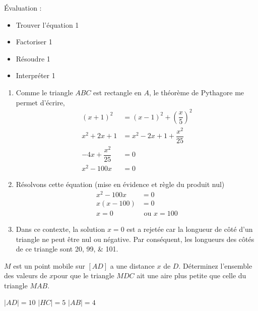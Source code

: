 \documentclass[../partie1.tex]{subfiles}
\begin{document}
\begin{solution}
    Évaluation :
    \begin{itemize}
        \item Trouver l'équation \hfill 1
        \item Factoriser \hfill 1
        \item Résoudre \hfill 1
        \item Interpréter \hfill 1
    \end{itemize}
    \begin{enumerate}
        \item Comme le triangle $ABC$ est rectangle en $A$, le théorème de Pythagore me permet d'écrire,
              \begin{align*}
                  (x+1)^2               & = (x-1)^2 +  \left(\dfrac{x}{5}\right)^2 \\
                  x^2+2x+1              & = x^2 - 2x + 1 + \dfrac{x^2}{25}         \\
                  -4x + \dfrac{x^2}{25} & =0                                       \\
                  x^2 -100x             & = 0
              \end{align*}
        \item Résolvons cette équation (mise en évidence et règle du produit nul)
              \begin{align*}
                  x^2 - 100x & = 0              \\
                  x(x-100)   & = 0              \\
                  x = 0      & \text{ ou }x=100
              \end{align*}
        \item Dans ce contexte, la solution $x=0$ est a rejetée car la longueur de côté d'un triangle ne peut être nul ou négative. Par conséquent, les longueurs des côtés de ce triangle sont \numlist{20;99;101}.
    \end{enumerate}

\end{solution}
\begin{exercise}[points=2]
    \(M\) est un point mobile sur \([AD]\) a une distance \(x\) de \(D\). Déterminez l'ensemble des valeurs de \(x\)pour que le triangle \(MDC\) ait une aire plus petite que celle du triangle \(MAB\).

    \parbox{3cm}{%
        \(\lvert AD \rvert=10\)\medbreak
        \(\lvert HC \rvert=5\)\medbreak
        \(\lvert AB \rvert=4\)%
    }
    \hfil
\end{exercise}
\begin{solution}

\end{solution}
\end{document}
